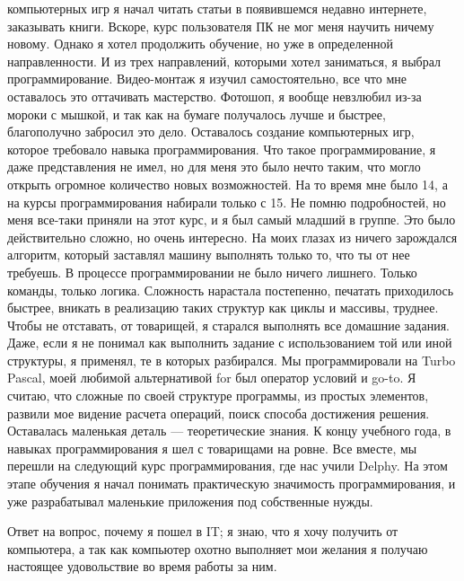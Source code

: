 компьютерных игр я начал читать статьи в появившемся недавно интернете, заказывать книги. Вскоре, курс пользователя ПК не мог
меня научить ничему новому. Однако я хотел продолжить обучение, но уже в определенной направленности. И из трех направлений,
которыми хотел заниматься, я выбрал программирование. Видео-монтаж я изучил самостоятельно, все что мне оставалось это
оттачивать мастерство. Фотошоп, я вообще невзлюбил из-за мороки с мышкой, и так как на бумаге получалось лучше и быстрее,
благополучно забросил это дело. Оставалось создание компьютерных игр, которое требовало навыка программирования. Что такое
программирование, я даже представления не имел, но для меня это было нечто таким, что могло открыть огромное количество новых
возможностей. На то время мне было 14, а на курсы программирования набирали только с 15. Не помню подробностей, но меня
все-таки приняли на этот курс, и я был самый младший в группе. Это было действительно сложно, но очень интересно. На моих
глазах из ничего зарождался алгоритм, который заставлял машину выполнять только то, что ты от нее требуешь. В процессе
программировании не было ничего лишнего. Только команды, только логика. Сложность нарастала постепенно, печатать приходилось
быстрее, вникать в реализацию таких структур как циклы и массивы, труднее. Чтобы не отставать, от товарищей, я старался
выполнять все домашние задания. Даже, если я не понимал как выполнить задание с использованием той или иной структуры, я
применял, те в которых разбирался. Мы программировали на Turbo Pascal, моей любимой альтернативой for был оператор условий и
go-to. Я считаю, что сложные по своей структуре программы, из простых элементов, развили мое видение расчета операций, поиск
способа достижения решения. Оставалась маленькая деталь --- теоретические знания. К концу учебного года, в навыках
программирования я шел с товарищами на ровне. Все вместе, мы перешли на следующий курс программирования, где нас учили Delphy.
На этом этапе обучения я начал понимать практическую значимость программирования, и уже разрабатывал маленькие приложения под
собственные нужды.

Ответ на вопрос, почему я пошел в IT; я знаю, что я хочу получить от компьютера, а так как компьютер охотно выполняет мои
желания я получаю настоящее удовольствие во время работы за ним.
